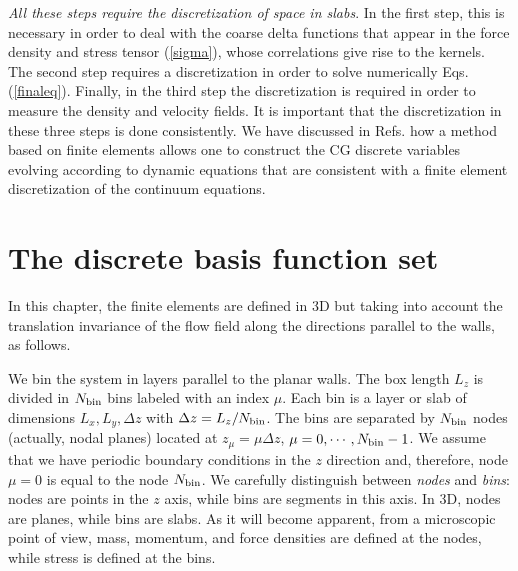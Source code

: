 \documentclass[b5paper,openright,11pt]{book}
\begin{document}
\textit{All  these  steps  require  the  discretization  of  space  in
  slabs}. In the  first step, this is necessary in  order to deal with
the coarse delta functions that appear  in the force density and stress
  tensor (\ref{sigma}), whose correlations give  rise to the kernels. The
second step  requires a discretization  in order to  solve numerically
Eqs.  (\ref{finaleq}).  Finally, in  the third step the discretization
is required in  order to measure the density and  velocity fields.  It
is  important that  the discretization  in these  three steps  is done
consistently. We have  discussed in Refs. \cite{DelaTorre2015,EspanolDonev2015} how  a method based
on  finite elements  allows one  to construct  the  CG discrete  variables
evolving according  to dynamic  equations that  are consistent  with a
finite  element  discretization of  the  continuum  equations. 


\section{The discrete basis function set}
\label{Sec:DiscreteBasis}
In this chapter, the finite elements are defined in 3D but taking into account the
translation invariance of the flow field along the directions parallel to the walls, as follows.

We bin  the system  in layers  parallel to the  planar walls.   The box
length $L_z$ is  divided in $N_{\rm bin}$ bins labeled  with an index
$\mu$.  Each bin  is a layer or slab of  dimensions $L_x,L_y,\Delta z$
with $\Delta  z=L_z/N_{\rm bin}$.  The  bins are separated  by $N_{\rm
  bin}$ nodes  (actually, nodal  planes) located at  $z_\mu=\mu \Delta
z$,  $\mu=0,\cdots,N_{\rm bin}-1$.   We assume  that we  have periodic
boundary  conditions  in  the  $z$ direction  and,  therefore,  node
$\mu=0$ is equal to the  node $N_{\rm bin}$.  We carefully distinguish
between \textit{nodes} and \textit{bins}: nodes  are points in the $z$
axis, while bins are segments in  this axis.  In 3D, nodes are planes,
while bins are slabs.  As it  will become apparent, from a microscopic
point of view, mass, momentum, and  force densities are defined at the
nodes, while stress is defined at the bins.
\end{document}
